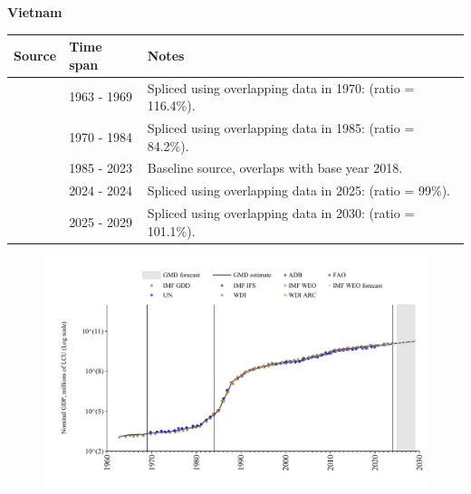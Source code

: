 \documentclass[12pt,a4paper,landscape]{article}
\begin{document}
\begin{adjustbox}{max totalsize={\paperwidth}{\paperheight},center}
\begin{minipage}[t][\textheight][t]{\textwidth}
\vspace*{0.5cm}
{}
\begin{center}
{\Large\bfseries Vietnam}
\end{center}
\vspace{0.5cm}
\begin{table}[H]
\centering
\small
\begin{tabular}{|l|l|l|}
\hline
\textbf{Source} & \textbf{Time span} & \textbf{Notes} \\
\hline
\rowcolor{white}\cite{IMF_GDD}& 1963 - 1969 &Spliced using overlapping data in 1970: (ratio = 116.4\%).\\
\rowcolor{lightgray}\cite{UN}& 1970 - 1984 &Spliced using overlapping data in 1985: (ratio = 84.2\%).\\
\rowcolor{white}\cite{WDI}& 1985 - 2023 &Baseline source, overlaps with base year 2018.\\
\rowcolor{lightgray}\cite{IMF_IFS}& 2024 - 2024 &Spliced using overlapping data in 2025: (ratio = 99\%).\\
\rowcolor{white}\cite{IMF_WEO_forecast}& 2025 - 2029 &Spliced using overlapping data in 2030: (ratio = 101.1\%).\\
\hline
\end{tabular}
\end{table}
\begin{figure}[H]
\centering
\includegraphics[width=\textwidth,height=0.6\textheight,keepaspectratio]{graphs/VNM_nGDP.pdf}
\end{figure}
\end{minipage}
\end{adjustbox}
\end{document}
